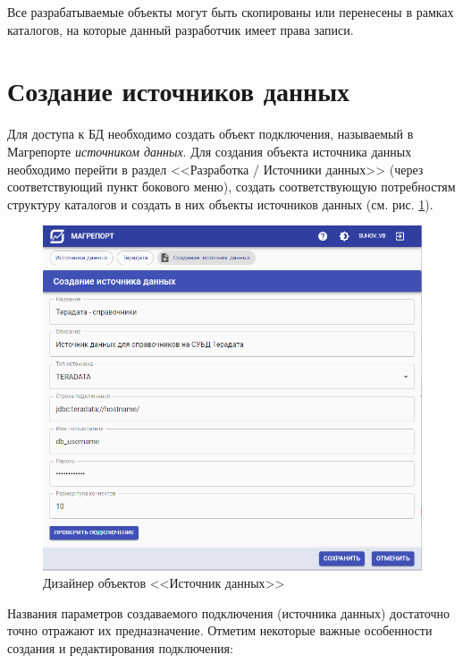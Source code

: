 \documentclass[../user-manual.tex]{subfiles}
\begin{document}
	Все разрабатываемые объекты могут быть скопированы или перенесены в рамках каталогов, на которые данный разработчик имеет права записи.

	
	\section{Создание источников данных}\label{developing:datasources}
	
	Для доступа к БД необходимо создать объект подключения, называемый в Магрепорте \textit{источником данных}. Для создания объекта источника данных необходимо перейти в раздел <<Разработка / Источники данных>> (через соответствующий пункт бокового меню), создать соответствующую потребностям структуру каталогов и создать в них объекты источников данных (см. рис. \ref{fig:create-datasource}).
	
	\begin{figure}[h]
		\centering
		\includegraphics[width=\graphicswidth]{img/2-create-datasource.png}
		\caption{Дизайнер объектов <<Источник данных>>}
		\label{fig:create-datasource}
	\end{figure}

	Названия параметров создаваемого подключения (источника данных) достаточно точно отражают их предназначение. Отметим некоторые важные особенности создания и редактирования подключения:
	
\end{document}
